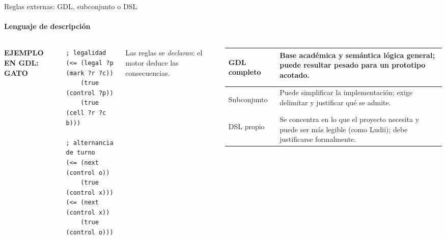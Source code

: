 \documentclass[aspectratio=169,10pt,t]{beamer}
\begin{document}
\begin{frame}[fragile]{Reglas externas: GDL, subconjunto o DSL}
\framesubtitle{Lenguaje de descripción}
\begin{columns}[T]
{\scriptsize\bfseries\color{vino} EJEMPLO EN GDL: GATO}\par\vspace{2pt}
\begin{lstlisting}
; legalidad
(<= (legal ?p (mark ?r ?c))
    (true (control ?p))
    (true (cell ?r ?c b)))

; alternancia de turno
(<= (next (control o))
    (true (control x)))
(<= (next (control x))
    (true (control o)))
\end{lstlisting}
{\scriptsize Las reglas se \emph{declaran}: el motor deduce las consecuencias.\par}
\footnotesize
\renewcommand{\arraystretch}{1.25}
\begin{tabularx}{\linewidth}{@{}>{\bfseries\raggedright\arraybackslash}p{2.0cm}>{\raggedright\arraybackslash}X@{}}
\toprule
GDL completo & Base académica y semántica lógica general; puede resultar pesado para un prototipo acotado. \\
\midrule
Subconjunto & Puede simplificar la implementación; exige delimitar y justificar qué se admite. \\
\midrule
DSL propio & Se concentra en lo que el proyecto necesita y puede ser más legible (como Ludii); debe justificarse formalmente. \\
\bottomrule
\end{tabularx}
\end{columns}
\end{frame}
\end{document}
